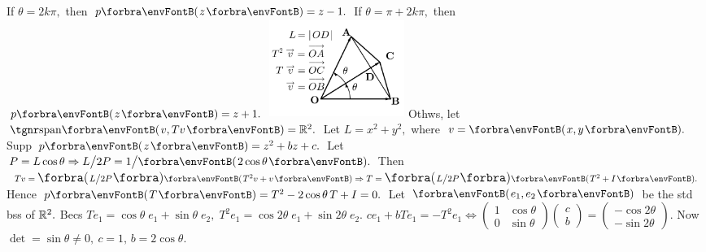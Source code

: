 If $\theta=2k\pi,$ then $p\Par{z}=z-1.$ If $\theta=\pi+2k\pi,$ then $p\Par{z}=z+1.$\vspace{-20pt}\parSol{}
\hfill\includegraphics[width=4.4cm,height=3.2cm,scale=0.22]{diagram5BI-1.png}\Blind{\quad}\vspace{-76pt}\parSol{}
Othws, let $\Span{v,Tv}=\Rbb^2.$ Let $L=x^2+y^2,$ where $v=\Par{x,y}.$\parSol{}
Supp $p\Par{z}=z^2+bz+c.$ Let $P=L\cos\theta\Rightarrow L\big/2P=1\big/\Par{2\cos\theta}.$\parSol{}
Then $Tv=\BigPar{L\big/2P}\Par{T^2 v+v}\Rightarrow T=\BigPar{L\big/2P}\Par{T^2+I}.$\parSol{}
Hence $p\Par{T}=T^2-2\cos\theta\, T+I=0.$\PfEnd\vspace{4pt}\parSol{}
\Or Let $\Par{e_1,e_2}$ be the std bss of ${\mathbb{R}}^2.$ Becs $Te_1=\cos\theta\;e_1+\sin\theta\;e_2,\;T^2e_1=\cos2\theta\;e_1+\sin2\theta\;e_2.$\vspace{0pt}\parSol{}
$ce_1+bTe_1=-T^2 e_1\Longleftrightarrow{}${\small$\begin{pmatrix}1 & \cos\theta\\0 & \sin\theta\end{pmatrix}\begin{pmatrix}c \\ b\end{pmatrix}$}${}={}${\small$\begin{pmatrix}-\cos2\theta\\-\sin2\theta\end{pmatrix}$}. Now $\det=\sin\theta\neq 0,\:c=1,\,b=2\cos\theta.$\PfEnd%
\SepLine
		
